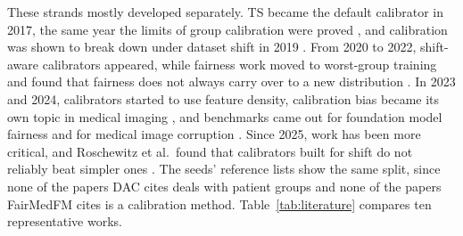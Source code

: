 \documentclass[sigconf,nonacm]{acmart}
\begin{document}
These strands mostly developed separately. TS became the default calibrator in 2017, the same year the limits of group calibration were proved \cite{pleiss2017fairness,kleinberg2017inherent}, and calibration was shown to break down under dataset shift in 2019 \cite{ovadia2019trust}. From 2020 to 2022, shift-aware calibrators appeared, while fairness work moved to worst-group training \cite{sagawa2020groupdro} and found that fairness does not always carry over to a new distribution \cite{schrouff2022diagnosing}. In 2023 and 2024, calibrators started to use feature density, calibration bias became its own topic in medical imaging \cite{riccilara2023calibration}, and benchmarks came out for foundation model fairness and for medical image corruption \cite{jin2024fairmedfm,disalvo2024medmnistc}. Since 2025, work has been more critical, and Roschewitz et al.\ found that calibrators built for shift do not reliably beat simpler ones \cite{roschewitz2025where}. The seeds' reference lists show the same split, since none of the papers DAC cites deals with patient groups and none of the papers FairMedFM cites is a calibration method. Table~\ref{tab:literature} compares ten representative works.
\end{document}
